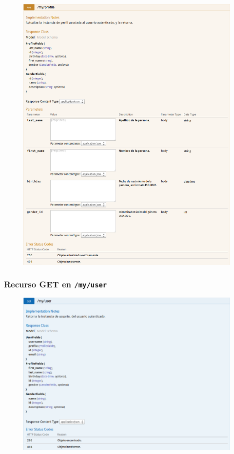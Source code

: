 \begin{figure}[h]
  \centering
  \includegraphics[width=\textwidth,height=.75\textheight,keepaspectratio]{img/especificacion_api/myProfileView_put}
  \label{myProfileView_put}
\end{figure}

\newpage


\subsubsection{Recurso GET en \texttt{/my/user}}

\begin{figure}[h]
  \centering
  \includegraphics[width=\textwidth,height=.75\textheight,keepaspectratio]{img/especificacion_api/myUserView_get}
  \label{myUserView_get}
\end{figure}

